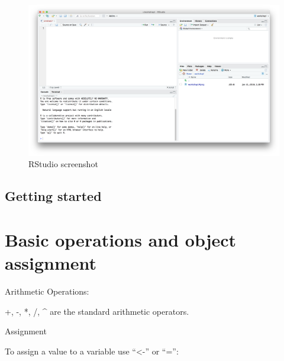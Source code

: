\documentclass[]{book}
\begin{document}
\begin{figure}
\includegraphics[width=1\linewidth]{RStudioscreenshot} \caption{RStudio screenshot}\label{fig:Rstudioscreenshot}
\end{figure}

\hypertarget{getting-started}{%
\subsection{Getting started}\label{getting-started}}

\hypertarget{basic-operations-and-object-assignment}{%
\section{Basic operations and object assignment}\label{basic-operations-and-object-assignment}}

Arithmetic Operations:

+, -, *, /, \^{} are the standard arithmetic operators.

Assignment

To assign a value to a variable use ``\textless-'' or ``='':
\end{document}
